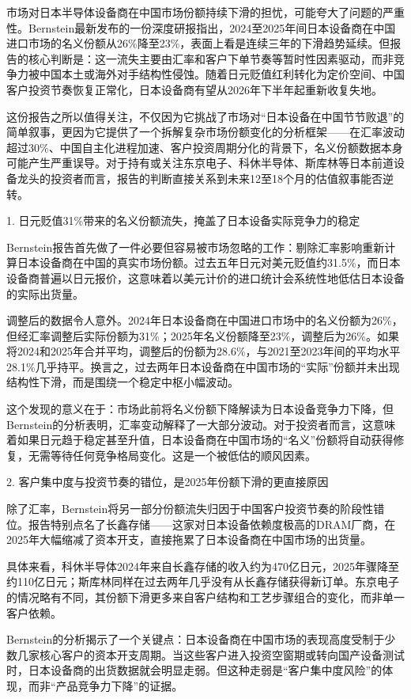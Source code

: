 \documentclass[11pt]{ctexart}
\begin{document}
市场对日本半导体设备商在中国市场份额持续下滑的担忧，可能夸大了问题的严重性。Bernstein最新发布的一份深度研报指出，2024至2025年间日本设备商在中国进口市场的名义份额从26\%降至23\%，表面上看是连续三年的下滑趋势延续。但报告的核心判断是：这一流失主要由汇率和客户下单节奏等暂时性因素驱动，而非竞争力被中国本土或海外对手结构性侵蚀。随着日元贬值红利转化为定价空间、中国客户投资节奏恢复正常化，日本设备商有望从2026年下半年起重新收复失地。

这份报告之所以值得关注，不仅因为它挑战了市场对“日本设备在中国节节败退”的简单叙事，更因为它提供了一个拆解复杂市场份额变化的分析框架——在汇率波动超过30\%、中国自主化进程加速、客户投资周期分化的背景下，名义份额数据本身可能产生严重误导。对于持有或关注东京电子、科休半导体、斯库林等日本前道设备龙头的投资者而言，报告的判断直接关系到未来12至18个月的估值叙事能否逆转。

1. 日元贬值31\%带来的名义份额流失，掩盖了日本设备实际竞争力的稳定

Bernstein报告首先做了一件必要但容易被市场忽略的工作：剔除汇率影响重新计算日本设备商在中国的真实市场份额。过去五年日元对美元贬值约31.5\%，而日本设备商普遍以日元报价，这意味着以美元计价的进口统计会系统性地低估日本设备的实际出货量。

调整后的数据令人意外。2024年日本设备商在中国进口市场中的名义份额为26\%，但经汇率调整后实际份额为31\%；2025年名义份额降至23\%，调整后为26\%。如果将2024和2025年合并平均，调整后的份额为28.6\%，与2021至2023年间的平均水平28.1\%几乎持平。换言之，过去两年日本设备商在中国市场的“实际”份额并未出现结构性下滑，而是围绕一个稳定中枢小幅波动。

这个发现的意义在于：市场此前将名义份额下降解读为日本设备竞争力下降，但Bernstein的分析表明，汇率变动解释了一大部分波动。对于投资者而言，这意味着如果日元趋于稳定甚至升值，日本设备商在中国市场的“名义”份额将自动获得修复，无需等待任何竞争格局变化。这是一个被低估的顺风因素。

2. 客户集中度与投资节奏的错位，是2025年份额下滑的更直接原因

除了汇率，Bernstein将另一部分份额流失归因于中国客户投资节奏的阶段性错位。报告特别点名了长鑫存储——这家对日本设备依赖度极高的DRAM厂商，在2025年大幅缩减了资本开支，直接拖累了日本设备商在中国市场的出货量。

具体来看，科休半导体2024年来自长鑫存储的收入约为470亿日元，2025年骤降至约110亿日元；斯库林同样在过去两年几乎没有从长鑫存储获得新订单。东京电子的情况略有不同，其份额下滑更多来自客户结构和工艺步骤组合的变化，而非单一客户依赖。

Bernstein的分析揭示了一个关键点：日本设备商在中国市场的表现高度受制于少数几家核心客户的资本开支周期。当这些客户进入投资空窗期或转向国产设备测试时，日本设备商的出货数据就会明显走弱。但这种走弱是“客户集中度风险”的体现，而非“产品竞争力下降”的证据。
\end{document}
